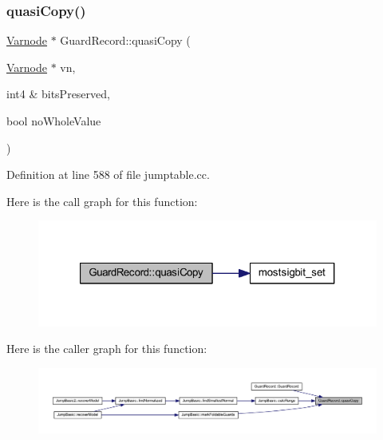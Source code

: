 \subsubsection{\texorpdfstring{quasiCopy()}{quasiCopy()}}
{\footnotesize\ttfamily \mbox{\hyperlink{class_varnode}{Varnode}} $\ast$ Guard\+Record\+::quasi\+Copy (\begin{DoxyParamCaption}\item[{\mbox{\hyperlink{class_varnode}{Varnode}} $\ast$}]{vn,  }\item[{int4 \&}]{bits\+Preserved,  }\item[{bool}]{no\+Whole\+Value }\end{DoxyParamCaption})\hspace{0.3cm}{\ttfamily [static]}}



Definition at line 588 of file jumptable.\+cc.

Here is the call graph for this function\+:
\nopagebreak
\begin{figure}[H]
\begin{center}
\leavevmode
\includegraphics[width=321pt]{class_guard_record_aae0d383384df8fbee667f88ee76b13f3_cgraph}
\end{center}
\end{figure}
Here is the caller graph for this function\+:
\nopagebreak
\begin{figure}[H]
\begin{center}
\leavevmode
\includegraphics[width=350pt]{class_guard_record_aae0d383384df8fbee667f88ee76b13f3_icgraph}
\end{center}
\end{figure}
\mbox{\label{class_guard_record_ab7999653314e91a17845f7f8eb92a3ec}} 
